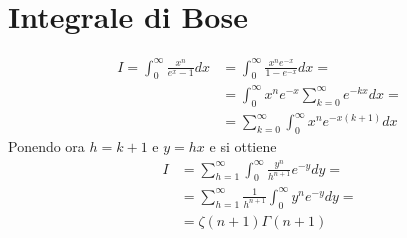 \documentclass[a4paper]{article}
\begin{document}
    \section*{Integrale di Bose}
        \begin{equation*}
            \begin{split}
                I=\int_0^\infty\frac{x^n}{e^x-1}dx&=\int_0^\infty\frac{x^ne^{-x}}{1-e^{-x}}dx=\\
                &=\int_0^\infty x^ne^{-x}\sum_{k=0}^\infty e^{-kx}dx=\\
                &=\sum_{k=0}^\infty\int_0^\infty x^ne^{-x(k+1)}dx
            \end{split}
        \end{equation*}
        Ponendo ora $h=k+1$ e $y=hx$ e  si ottiene
        \begin{equation*}
            \begin{split}
                I&=\sum_{h=1}^\infty\int_0^\infty \frac{y^n}{h^{n+1}}e^{-y}dy=\\
                &=\sum_{h=1}^\infty\frac{1}{h^{n+1}}\int_0^\infty y^ne^{-y}dy=\\
                &=\zeta(n+1)\Gamma(n+1)
            \end{split}
        \end{equation*}
\end{document}
